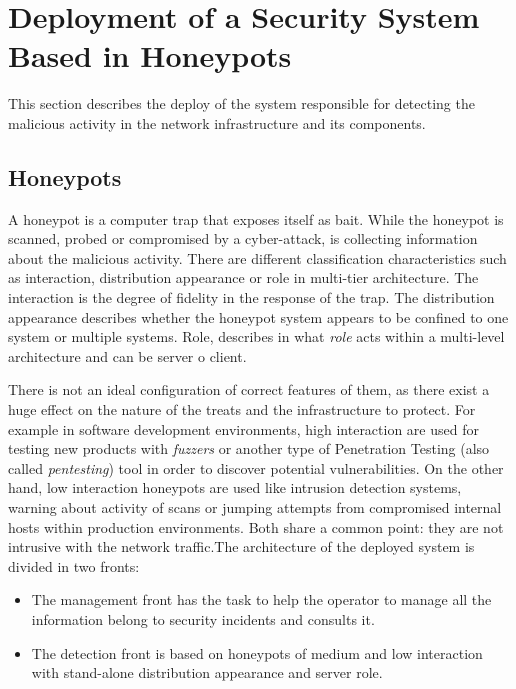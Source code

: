 \documentclass[a4paper]{llncs}
\begin{document}
\section{Deployment of a Security System Based in Honeypots}
\label{sec:deployment}
This section describes the deploy of the system responsible for detecting the malicious activity in the network infrastructure and its components.

\subsection{Honeypots}
A honeypot is a computer trap that exposes itself as bait. While the honeypot is scanned, probed or compromised by a cyber-attack, is collecting information about the malicious activity. There are different classification characteristics such as interaction, distribution appearance or role in multi-tier architecture\cite{Seifert06taxonomyof}. The interaction is the degree of fidelity in the response of the trap. The distribution appearance describes whether the honeypot system appears to be confined to one system or multiple systems. Role, describes in what {\it role} acts within a multi-level architecture and can be server o client.

There is not an ideal configuration of correct features of them, as there exist a huge effect on the nature of the treats and the infrastructure to protect. For example in software development environments, high interaction are used for testing new products with {\it fuzzers} or another type of Penetration Testing (also called {\it pentesting}) tool \cite{fuzzingforsec} in order to discover potential vulnerabilities. On the other hand, low interaction honeypots are used like intrusion detection systems, warning about activity of scans or jumping attempts from compromised internal hosts within production environments. Both share a common point: they are not intrusive with the network traffic.The architecture of the deployed system is divided in two fronts:
\begin{itemize}
	\item The management front has the task to help the operator to manage all the information belong to security incidents and consults it.
	\item The detection front is based on honeypots of medium and low interaction with stand-alone distribution appearance and server role.
\end{itemize}
\end{document}
